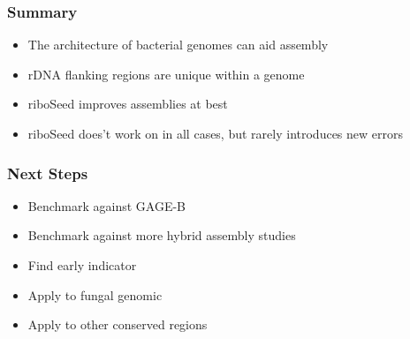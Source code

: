 \documentclass[10pt, compress]{beamer}
\begin{document}
 \begin{frame}[fragile]
  \frametitle{Summary}
  \begin{itemize}[<+- | alert@+>]
  \item The architecture of bacterial genomes can aid assembly
  \item rDNA flanking regions are unique within a genome
  \item riboSeed improves assemblies at best
  \item riboSeed does't work on in all cases, but rarely introduces new errors
  \end{itemize}
\end{frame}

\begin{frame}[fragile]
  \frametitle{Next Steps}
  \begin{itemize}
  \item Benchmark against GAGE-B
  \item Benchmark against more hybrid assembly studies
  \item Find early indicator
  \item Apply to fungal genomic
  \item Apply to other conserved regions
  \end{itemize}
\end{frame}



\begin{frame}
%

\end{frame}
\end{document}
